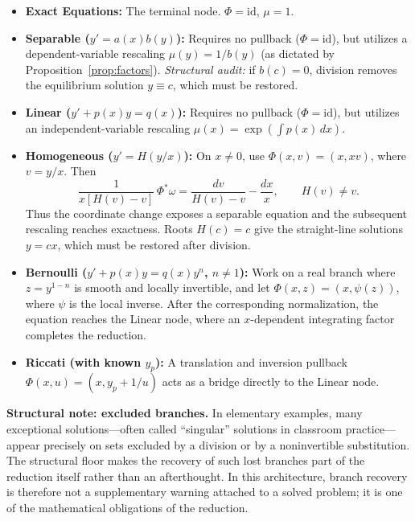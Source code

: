 \documentclass[11pt]{article}
\theoremstyle{definition}
\begin{document}
\begin{itemize}
    \item \textbf{Exact Equations:} The terminal node. \(\Phi = \mathrm{id}\), \(\mu = 1\).
    \item \textbf{Separable (\(y'=a(x)b(y)\)):} Requires no pullback (\(\Phi = \mathrm{id}\)), but utilizes a dependent-variable rescaling \(\mu(y) = 1/b(y)\) (as dictated by Proposition~\ref{prop:factors}). \emph{Structural audit:} if \(b(c)=0\), division removes the equilibrium solution \(y\equiv c\), which must be restored.
    \item \textbf{Linear (\(y'+p(x)y=q(x)\)):} Requires no pullback (\(\Phi = \mathrm{id}\)), but utilizes an independent-variable rescaling \(\mu(x) = \exp(\int p(x)\,dx)\).
    \item \textbf{Homogeneous (\(y'=H(y/x)\)):} On \(x\neq0\), use \(\Phi(x,v)=(x,xv)\), where \(v=y/x\). Then
    \[
    \frac{1}{x[H(v)-v]}\,\Phi^*\omega
    =\frac{dv}{H(v)-v}-\frac{dx}{x},\qquad H(v)\neq v.
    \]
    Thus the coordinate change exposes a separable equation and the subsequent rescaling reaches exactness. Roots \(H(c)=c\) give the straight-line solutions \(y=cx\), which must be restored after division.
    \item \textbf{Bernoulli (\(y'+p(x)y=q(x)y^n\), \(n\neq1\)):} Work on a real branch where \(z=y^{1-n}\) is smooth and locally invertible, and let \(\Phi(x,z)=(x,\psi(z))\), where \(\psi\) is the local inverse. After the corresponding normalization, the equation reaches the Linear node, where an \(x\)-dependent integrating factor completes the reduction.
    \item \textbf{Riccati (with known \(y_p\)):} A translation and inversion pullback \(\Phi(x,u)=(x, y_p + 1/u)\) acts as a bridge directly to the Linear node.
\end{itemize}

\textbf{Structural note: excluded branches.} In elementary examples, many exceptional solutions---often called ``singular'' solutions in classroom practice---appear precisely on sets excluded by a division or by a noninvertible substitution. The structural floor makes the recovery of such lost branches part of the reduction itself rather than an afterthought. In this architecture, branch recovery is therefore not a supplementary warning attached to a solved problem; it is one of the mathematical obligations of the reduction.
\end{document}
